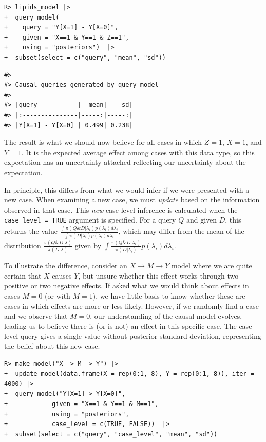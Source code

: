 \documentclass[
  11pt,
  article]{jss}
\begin{document}
\begin{verbatim}
R> lipids_model |>
+  query_model(
+    query = "Y[X=1] - Y[X=0]",
+    given = "X==1 & Y==1 & Z==1",
+    using = "posteriors")  |> 
+  subset(select = c("query", "mean", "sd"))
\end{verbatim}

\begin{verbatim}
#> 
#> Causal queries generated by query_model
#> 
#> |query           |  mean|    sd|
#> |:---------------|-----:|-----:|
#> |Y[X=1] - Y[X=0] | 0.499| 0.238|
\end{verbatim}

The result is what we should now believe for all cases in which \(Z=1\),
\(X=1\), and \(Y=1\). It is the expected average effect among cases with
this data type, so this expectation has an uncertainty attached
reflecting our uncertainty about the expectation.

In principle, this differs from what we would infer if we were presented
with a new case. When examining a new case, we must \emph{update} based
on the information observed in that case. This \emph{new} case-level
inference is calculated when the \texttt{case\_level\ =\ TRUE} argument
is specified. For a query \(Q\) and given \(D\), this returns the value
\(\frac{\int\pi(Q \& D | \lambda_i)p(\lambda_i)d\lambda_i}{\int\pi(D | \lambda_i)p(\lambda_i)d\lambda_i}\),
which may differ from the mean of the distribution
\(\frac{\pi(Q \& D | \lambda)}{\pi(D | \lambda)}\) given by
\(\int \frac{\pi(Q \& D | \lambda_i)}{\pi(D | \lambda_i)} p(\lambda_i)d\lambda_i\).

To illustrate the difference, consider an
\(X \rightarrow M \rightarrow Y\) model where we are quite certain that
\(X\) causes \(Y\), but unsure whether this effect works through two
positive or two negative effects. If asked what we would think about
effects in cases \(M=0\) (or with \(M=1\)), we have little basis to know
whether these are cases in which effects are more or less likely.
However, if we randomly find a case and we observe that \(M=0\), our
understanding of the causal model evolves, leading us to believe there
is (or is not) an effect in this specific case. The case-level query
gives a single value without posterior standard deviation, representing
the belief about this new case.

\begin{verbatim}
R> make_model("X -> M -> Y") |>
+  update_model(data.frame(X = rep(0:1, 8), Y = rep(0:1, 8)), iter = 4000) |>
+  query_model("Y[X=1] > Y[X=0]", 
+            given = "X==1 & Y==1 & M==1", 
+            using = "posteriors",
+            case_level = c(TRUE, FALSE))  |> 
+  subset(select = c("query", "case_level", "mean", "sd"))
\end{verbatim}
\end{document}
